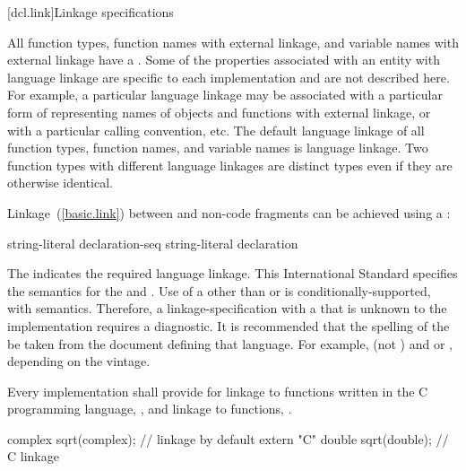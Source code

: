 [dcl.link]{Linkage specifications}%

\pnum
All function types, function names with external linkage, and variable
names with external linkage have a .
\enternote
Some of the properties associated with an entity with language linkage
are specific to each implementation and are not described here. For
example, a particular language linkage may be associated with a
particular form of representing names of objects and functions with
external linkage, or with a particular calling convention, etc.
\exitnote
The default language linkage of all function types, function names, and
variable names is \Cpp language linkage. Two function types with
different language linkages are distinct types even if they are
otherwise identical.

\pnum
Linkage~(\ref{basic.link}) between \Cpp and  non-\Cpp code fragments can
be achieved using a :

%
%
%
\begin{bnf}
\br
     string-literal \terminal{\{} declaration-seq\opt{} \terminal{\}}\br
     string-literal declaration
\end{bnf}

The  indicates the required language linkage.
This International Standard specifies the semantics for the
  and . Use of a
 other than  or  is
conditionally-supported, with  semantics.
\enternote
Therefore, a linkage-specification with a  that
is unknown to the implementation requires a diagnostic.
\exitnote
\enternote
It is recommended that the spelling of the  be
taken from the document defining that language. For example, 
(not ) and  or , depending on
the vintage.
\exitnote

\pnum
{}%
Every implementation shall provide for linkage to functions written in
the C programming language,
%
, and linkage to \Cpp functions, .
\enterexample

\begin{codeblock}
complex sqrt(complex);          // \Cpp linkage by default
extern "C" {
  double sqrt(double);          // C linkage
}
\end{codeblock}
\exitexample

